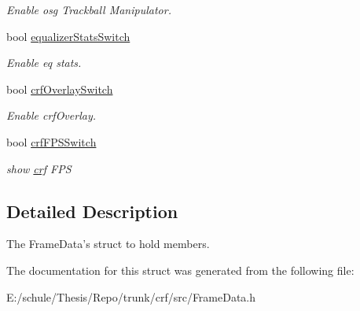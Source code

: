 \begin{CompactItemize}
\begin{CompactList}\small\item\em Enable osg Trackball Manipulator. \item\end{CompactList}\item 
\hypertarget{a00008_bf1897dca052068e3240c5779f5d8944}{
bool \hyperlink{a00008_bf1897dca052068e3240c5779f5d8944}{equalizerStatsSwitch}}
\label{a00008_bf1897dca052068e3240c5779f5d8944}

\begin{CompactList}\small\item\em Enable eq stats. \item\end{CompactList}\item 
\hypertarget{a00008_2d2657de7d24d1921cd9818308ac3106}{
bool \hyperlink{a00008_2d2657de7d24d1921cd9818308ac3106}{crfOverlaySwitch}}
\label{a00008_2d2657de7d24d1921cd9818308ac3106}

\begin{CompactList}\small\item\em Enable crfOverlay. \item\end{CompactList}\item 
\hypertarget{a00008_50fb31217b91cb805acf163645674bcf}{
bool \hyperlink{a00008_50fb31217b91cb805acf163645674bcf}{crfFPSSwitch}}
\label{a00008_50fb31217b91cb805acf163645674bcf}

\begin{CompactList}\small\item\em show \hyperlink{a00043}{crf} FPS \item\end{CompactList}\end{CompactItemize}


\subsection{Detailed Description}
The FrameData's struct to hold members. 

The documentation for this struct was generated from the following file:\begin{CompactItemize}
\item 
E:/schule/Thesis/Repo/trunk/crf/src/FrameData.h\end{CompactItemize}
